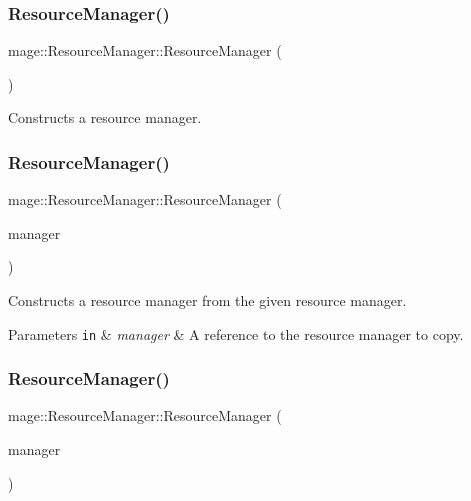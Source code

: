 \subsubsection{\texorpdfstring{Resource\+Manager()}{ResourceManager()}\hspace{0.1cm}{\footnotesize\ttfamily [1/3]}}
{\footnotesize\ttfamily mage\+::\+Resource\+Manager\+::\+Resource\+Manager (\begin{DoxyParamCaption}{ }\end{DoxyParamCaption})\hspace{0.3cm}{\ttfamily [default]}}

Constructs a resource manager. \hypertarget{classmage_1_1_resource_manager_ac93f3ab65a9f45539b5a0221ebc197fe}{}\label{classmage_1_1_resource_manager_ac93f3ab65a9f45539b5a0221ebc197fe} 
\subsubsection{\texorpdfstring{Resource\+Manager()}{ResourceManager()}\hspace{0.1cm}{\footnotesize\ttfamily [2/3]}}
{\footnotesize\ttfamily mage\+::\+Resource\+Manager\+::\+Resource\+Manager (\begin{DoxyParamCaption}\item[{const \hyperlink{classmage_1_1_resource_manager}{Resource\+Manager} \&}]{manager }\end{DoxyParamCaption})\hspace{0.3cm}{\ttfamily [delete]}}

Constructs a resource manager from the given resource manager.


\begin{DoxyParams}[1]{Parameters}
\mbox{\tt in}  & {\em manager} & A reference to the resource manager to copy. \\
\hline
\end{DoxyParams}
\hypertarget{classmage_1_1_resource_manager_af4070faaf8c55fcdbba44662111eda91}{}\label{classmage_1_1_resource_manager_af4070faaf8c55fcdbba44662111eda91} 
\subsubsection{\texorpdfstring{Resource\+Manager()}{ResourceManager()}\hspace{0.1cm}{\footnotesize\ttfamily [3/3]}}
{\footnotesize\ttfamily mage\+::\+Resource\+Manager\+::\+Resource\+Manager (\begin{DoxyParamCaption}\item[{\hyperlink{classmage_1_1_resource_manager}{Resource\+Manager} \&\&}]{manager }\end{DoxyParamCaption})\hspace{0.3cm}{\ttfamily [delete]}}

